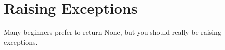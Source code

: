 \section{Raising Exceptions}

  Many beginners prefer to return None, but you should really be raising exceptions. 

